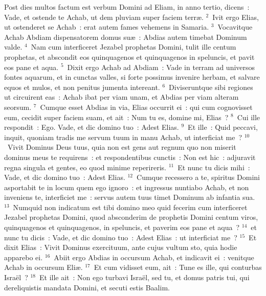 \bchapter
\lettrine[lines=3,image=true,loversize=0.05,lraise=-0.03]{P}{}ost dies multos factum est verbum Domini ad Eliam, in anno tertio, dicens~: Vade, et ostende te Achab, ut dem pluviam super faciem terr\ae .
${}^{2}$~Ivit ergo Elias, ut ostenderet se Achab~: erat autem fames vehemens in Samaria.
${}^{3}$~Vocavitque Achab Abdiam dispensatorem domus su\ae~: Abdias autem timebat Dominum valde.
${}^{4}$~Nam cum interficeret Jezabel prophetas Domini, tulit ille centum prophetas, et abscondit eos quinquagenos et quinquagenos in speluncis, et pavit eos pane et aqua.
${}^{5}$~Dixit ergo Achab ad Abdiam~: Vade in terram ad universos fontes aquarum, et in cunctas valles, si forte possimus invenire herbam, et salvare equos et mulos, et non penitus jumenta intereant.
${}^{6}$~Diviseruntque sibi regiones ut circuirent eas~: Achab ibat per viam unam, et Abdias per viam alteram seorsum.
${}^{7}$~Cumque esset Abdias in via, Elias occurrit ei~: qui cum cognovisset eum, cecidit super faciem suam, et ait~: Num tu es, domine mi, Elias~?
${}^{8}$~Cui ille respondit~: Ego. Vade, et dic domino tuo~: Adest Elias.
${}^{9}$~Et ille~: Quid peccavi, inquit, quoniam tradis me servum tuum in manu Achab, ut interficiat me~?
${}^{10}$~Vivit Dominus Deus tuus, quia non est gens aut regnum quo non miserit dominus meus te requirens~: et respondentibus cunctis~: Non est hic~: adjuravit regna singula et gentes, eo quod minime reperireris.
${}^{11}$~Et nunc tu dicis mihi~: Vade, et dic domino tuo~: Adest Elias.
${}^{12}$~Cumque recessero a te, spiritus Domini asportabit te in locum quem ego ignoro~: et ingressus nuntiabo Achab, et non inveniens te, interficiet me~: servus autem tuus timet Dominum ab infantia sua.
${}^{13}$~Numquid non indicatum est tibi domino meo quid fecerim cum interficeret Jezabel prophetas Domini, quod absconderim de prophetis Domini centum viros, quinquagenos et quinquagenos, in speluncis, et paverim eos pane et aqua~?
${}^{14}$~et nunc tu dicis~: Vade, et dic domino tuo~: Adest Elias~: ut interficiat me~?
${}^{15}$~Et dixit Elias~: Vivit Dominus exercituum, ante cujus vultum sto, quia hodie apparebo ei.
${}^{16}$~Abiit ergo Abdias in occursum Achab, et indicavit ei~: venitque Achab in occursum Eli\ae .
${}^{17}$~Et cum vidisset eum, ait~: Tune es ille, qui conturbas Isra\"el~?
${}^{18}$~Et ille ait~: Non ego turbavi Isra\"el, sed tu, et domus patris tui, qui dereliquistis mandata Domini, et secuti estis Baalim.


